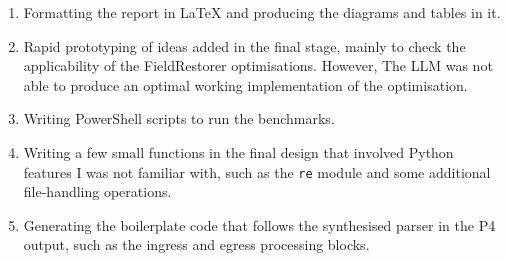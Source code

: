 \documentclass[12pt,a4paper]{report}
\begin{document}
\begin{enumerate}
    \item Formatting the report in LaTeX and producing the diagrams
    and tables in it.
    \item Rapid prototyping of ideas added in the final stage,
    mainly to check the applicability of the FieldRestorer
    optimisations. However, The LLM was not able to produce an optimal working
    implementation of the optimisation.
    \item Writing PowerShell scripts to run the benchmarks.
    \item Writing a few small functions in the final design that
    involved Python features I was not familiar with, such
    as the \texttt{re} module and some additional file-handling
    operations.
    \item Generating the boilerplate code that follows the
    synthesised parser in the P4 output, such as the ingress and
    egress processing blocks.
\end{enumerate}
\end{document}

